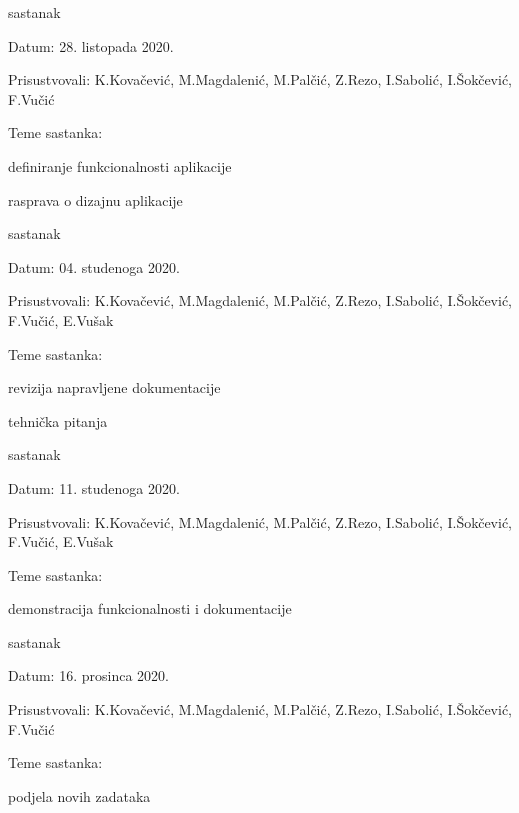 \begin{packed_enum}
	\item sastanak
	\begin{packed_item}
		\item Datum: 28. listopada 2020.
		\item Prisustvovali: K.Kovačević, M.Magdalenić, M.Palčić, Z.Rezo, I.Sabolić, I.Šokčević, F.Vučić
		\item Teme sastanka:
		\begin{packed_item}
			\item definiranje funkcionalnosti aplikacije
			\item rasprava o dizajnu aplikacije\\
		\end{packed_item}
	\end{packed_item}
	
	\item sastanak
	\begin{packed_item}
		\item Datum: 04. studenoga 2020.
		\item Prisustvovali: K.Kovačević, M.Magdalenić, M.Palčić, Z.Rezo, I.Sabolić, I.Šokčević, F.Vučić, E.Vušak
		\item Teme sastanka:
		\begin{packed_item}
			\item revizija napravljene dokumentacije
			\item tehnička pitanja\\
		\end{packed_item}
	\end{packed_item}
	
	\item sastanak
	\begin{packed_item}
		\item Datum: 11. studenoga 2020.
		\item Prisustvovali: K.Kovačević, M.Magdalenić, M.Palčić, Z.Rezo, I.Sabolić, I.Šokčević, F.Vučić, E.Vušak
		\item Teme sastanka:
		\begin{packed_item}
			\item demonstracija funkcionalnosti i dokumentacije\\
		\end{packed_item}
	\end{packed_item}
	
	\item sastanak
	\begin{packed_item}
		\item Datum: 16. prosinca 2020.
		\item Prisustvovali: K.Kovačević, M.Magdalenić, M.Palčić, Z.Rezo, I.Sabolić, I.Šokčević, F.Vučić
		\item Teme sastanka:
		\begin{packed_item}
			\item podjela novih zadataka\\
		\end{packed_item}
	\end{packed_item}
	

\end{packed_enum}
